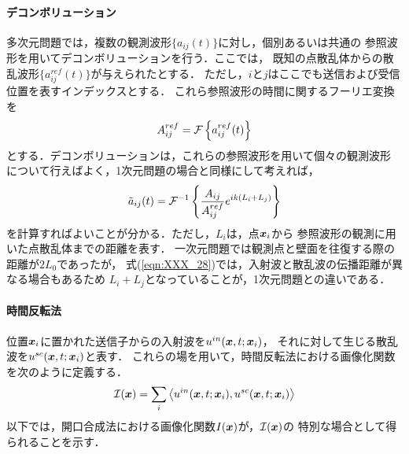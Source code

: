 \paragraph{デコンボリューション}
多次元問題では，複数の観測波形$\{ a_{ij}(t)\}$に対し，個別あるいは共通の
参照波形を用いてデコンボリューションを行う．ここでは，
既知の点散乱体からの散乱波形$\{a^{ref}_{ij}(t)\}$が与えられたとする．
ただし，$i$と$j$はここでも送信および受信位置を表すインデックスとする．
これら参照波形の時間に関するフーリエ変換を
\begin{equation}
	A_{ij}^{ref} ={\cal F} \left\{ a^{ref}_{ij}(t)\right\}
	\label{eqn:XXX_Aij0}
\end{equation}
とする．デコンボリューションは，これらの参照波形を用いて個々の観測波形
について行えばよく，1次元問題の場合と同様にして考えれば，
\begin{equation}
	\tilde a_{ij}(t) = {\cal F}^{-1} 
	\left\{
		\frac{A_{ij}}{A_{ij}^{ref}}e^{ik(L_i+L_j)}
	\right\}
	\label{eqn:XXX_28}
\end{equation}
を計算すればよいことが分かる．ただし，$L_i$は，点$\mbox{\boldmath $x$}_i$から
参照波形の観測に用いた点散乱体までの距離を表す．
一次元問題では観測点と壁面を往復する際の距離が$2L_0$であったが，
式(\ref{eqn:XXX_28})では，入射波と散乱波の伝播距離が異なる場合もあるため
$L_i+L_j$となっていることが，1次元問題との違いである．
%
\paragraph{時間反転法}
位置$\mbox{\boldmath $x$}_i$に置かれた送信子からの入射波を$u^{in}(\mbox{\boldmath $x$},t;\mbox{\boldmath $x$}_i)$，
それに対して生じる散乱波を$u^{sc}(\mbox{\boldmath $x$},t;\mbox{\boldmath $x$}_i)$と表す．
これらの場を用いて，時間反転法における画像化関数を次のように定義する．
\begin{equation}
	{\cal I}(\mbox{\boldmath $x$})
		=
	\sum_{i}
	\left<
		u^{in}(\mbox{\boldmath $x$},t;\mbox{\boldmath $x$}_i), u^{sc}(\mbox{\boldmath $x$},t;\mbox{\boldmath $x$}_i)
	\right>
	\label{eqn:XXX_Ix_trev}
\end{equation}
以下では，開口合成法における画像化関数$I(\mbox{\boldmath $x$})$が，${\cal I}(\mbox{\boldmath $x$})$の
特別な場合として得られることを示す．\\
%

